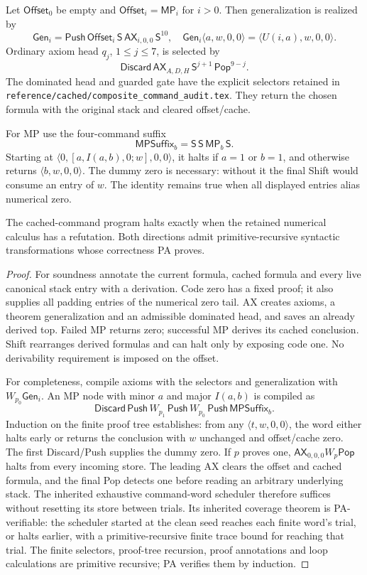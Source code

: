 \documentclass[11pt,letterpaper]{article}
\newcommand{\file}[1]{\texttt{\nolinkurl{#1}}}
\newcommand{\AX}{\mathsf{AX}}\newcommand{\MP}{\mathsf{MP}}\newcommand{\Shift}{\mathsf S}
\begin{document}
Let $\mathsf{Offset}_0$ be empty and $\mathsf{Offset}_i=\MP_i$ for $i>0$.
Then generalization is realized by
\[
 \mathsf{Gen}_i=\mathsf{Push}\,\mathsf{Offset}_i\,\Shift\,
                    \AX_{i,0,0}\,\Shift^{10},
\quad
 \mathsf{Gen}_i\langle a,w,0,0\rangle
      =\langle U(i,a),w,0,0\rangle.
\]
Ordinary axiom head $q_j$, $1\le j\le7$, is selected by
\[
 \mathsf{Discard}\,\AX_{A,D,H}\,\Shift^{j+1}\,
                      \mathsf{Pop}^{9-j}.
\]
The dominated head and guarded gate have the explicit selectors retained in
\file{reference/cached/composite_command_audit.tex}. They return the chosen
formula with the original stack and cleared offset/cache.

For MP use the four-command suffix
\[
 \mathsf{MPSuffix}_b=\Shift\,\Shift\,\MP_b\,\Shift.
\]
Starting at $\langle0,[a,I(a,b),0;w],0,0\rangle$, it halts if $a=1$ or
$b=1$, and otherwise returns $\langle b,w,0,0\rangle$. The dummy zero is
necessary: without it the final Shift would consume an entry of $w$.
The identity remains true when all displayed entries alias numerical zero.

\begin{lemma}
The cached-command program halts exactly when the retained numerical calculus
has a refutation. Both directions admit primitive-recursive syntactic
transformations whose correctness PA proves.
\end{lemma}
\begin{proof}
For soundness annotate the current formula, cached formula and every live
canonical stack entry with a derivation. Code zero has a fixed proof; it also
supplies all padding entries of the numerical zero tail. AX creates axioms,
a theorem generalization and an admissible dominated head, and saves an
already derived top. Failed MP returns zero; successful MP derives its cached
conclusion. Shift rearranges derived formulas and can halt only by exposing
code one. No derivability requirement is imposed on the offset.

For completeness, compile axioms with the selectors and generalization with
$W_{p_0}\mathsf{Gen}_i$. An MP node with minor $a$ and major $I(a,b)$ is compiled as
\[
 \mathsf{Discard}\,\mathsf{Push}\,
 W_{p_1}\,\mathsf{Push}\,W_{p_0}\,\mathsf{Push}\,\mathsf{MPSuffix}_b.
\]
Induction on the finite proof tree establishes: from any
$\langle t,w,0,0\rangle$, the word either halts early or returns the conclusion
with $w$ unchanged and offset/cache zero. The first Discard/Push supplies the
dummy zero. If $p$ proves one, $\AX_{0,0,0}W_p\mathsf{Pop}$ halts from every
incoming store. The leading AX clears the offset and cached formula, and the final Pop detects
one before reading an arbitrary underlying stack. The inherited exhaustive
command-word scheduler therefore suffices without resetting its store between
trials. Its inherited coverage theorem is PA-verifiable: the scheduler started
at the clean seed reaches each finite word's trial, or halts earlier, with a
primitive-recursive finite trace bound for reaching that trial. The finite
selectors, proof-tree recursion, proof annotations and
loop calculations are primitive recursive; PA verifies them by induction.
\end{proof}
\end{document}
